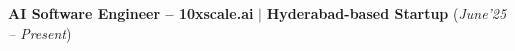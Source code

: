 \documentclass[9pt,a4paper]{extarticle}
\begin{document}

\begin{tcolorbox}[colback=gray!15,height=5.7mm,width=20.00cm]
\textbf{AI Software Engineer – 10xscale.ai} \(|\)\textbf{ Hyderabad-based Startup} \hfill (\textit{June'25 – Present})
\end{tcolorbox}
\vspace{-0.2cm}
\end{document}
